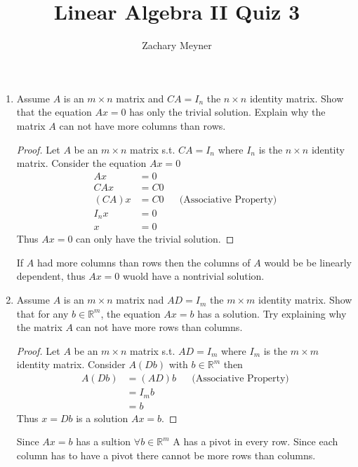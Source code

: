 \documentclass[12pt]{article}
\title{\large Linear Algebra II Quiz 3}
\author{\large Zachary Meyner}
\date{}
\begin{document}
\maketitle
    \begin{enumerate}
        \item Assume $A$ is an $m \times n$ matrix and $CA=I_n$ the $n \times n$ identity matrix. Show that the 
        equation $Ax=0$ has only the trivial solution. Explain why the matrix $A$ can not have 
        more columns than rows.
        \begin{proof}
            Let $A$ be an $m \times n$ matrix s.t. $CA=I_n$ where $I_n$ is the $n \times n$ identity matrix. 
            Consider the equation $Ax=0$
            \begin{align*}
                Ax&=0 \\
                CAx&=C0 \\
                (CA)x&=C0 && \text{(Associative Property)} \\
                I_{n}x &= 0 \\
                x&=0
            \end{align*}
            Thus $Ax=0$ can only have the trivial solution.
        \end{proof}
        If $A$ had more columns than rows then the columns of $A$ would be be linearly dependent, 
        thus $Ax=0$ wuold have a nontrivial solution.
        \item Assume $A$ is an $m \times n$ matrix nad $AD=I_m$ the $m \times m$ identity matrix. Show that for
        any $b \in \mathbb{R}^m$, the equation $Ax=b$ has a solution. Try explaining why the matrix $A$
        can not have more rows than columns.
        \begin{proof}
            Let $A$ be an $m \times n$ matrix s.t. $AD=I_m$ where $I_m$ is the $m \times m$ identity 
            matrix. Consider $A(Db)$ with $b \in \mathbb{R}^m$ then
            \begin{align*}
                A(Db) &= (AD)b  && \text{(Associative Property)}\\
                &= I_{m}b \\
                &= b
            \end{align*}
            Thus $x=Db$ is a solution $Ax=b$.
        \end{proof}
        Since $Ax=b$ has a sultion $\forall b \in \mathbb{R}^m$ A has a pivot in every row. Since each column 
        has to have a pivot there cannot be more rows than columns.

\end{enumerate}
\end{document}
